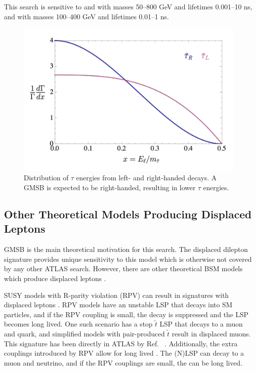 This search is sensitive to \selec and \smu with masses 50--800 GeV and lifetimes 0.001--10 ns, and \stau with masses 100--400 GeV and lifetimes 0.01--1 ns.

\begin{figure}[!h]
\centering
\includegraphics[width=.7\textwidth]{figures/theory/tau-pt.png}
\caption{Distribution of $\tau$ energies from left- and right-handed \stau decays. A \ac{GMSB} \stau is expected to be right-handed, resulting in lower $\tau$ energies.}
\label{fig:taupt}
\end{figure}

\subsection{Other Theoretical Models Producing Displaced Leptons}

\ac{GMSB} \slep is the main theoretical motivation for this search. The displaced dilepton signature provides unique sensitivity to this model which is otherwise not covered by any other \ac{ATLAS} search. However, there are other theoretical \ac{BSM} models which produce displaced leptons \cite{jesseshelton}.

\ac{SUSY} models with R-parity violation (RPV) can result in signatures with displaced leptons \cite{Barbier_2005}. RPV models have an unstable \ac{LSP} that decays into \ac{SM} particles, and if the RPV coupling is small, the decay is suppressed and the \ac{LSP} becomes long lived. One such scenario has a stop $\tilde{t}$ \ac{LSP} that decays to a muon and quark, and simplified models with pair-produced $\tilde{t}$ result in displaced muons. This signature has been directly in \ac{ATLAS} by Ref. ~\cite{dvplusmu}. Additionally, the extra couplings introduced by RPV allow for long lived \stau. The \stau (N)LSP can decay to a muon and neutrino, and if the RPV couplings are small, the \stau can be long lived.

